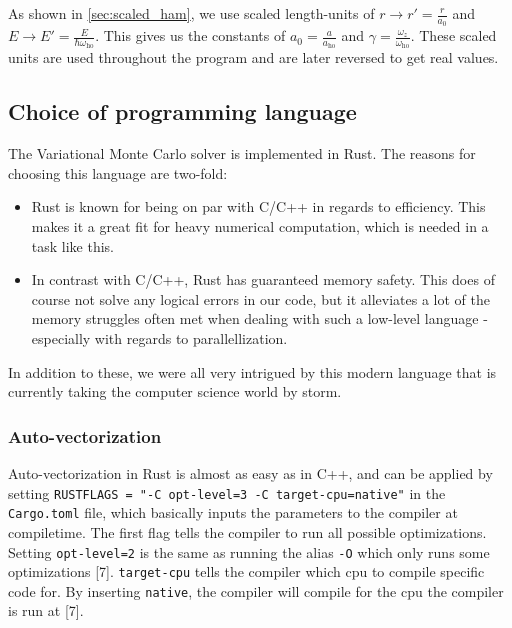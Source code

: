 \documentclass[
]{article}
\providecommand{\tightlist}{%
  \setlength{\itemsep}{0pt}\setlength{\parskip}{0pt}}
\begin{document}
As shown in \ref{sec:scaled_ham}, we use scaled length-units of
\(r \rightarrow r' = \frac{r}{a_0}\) and
\(E \rightarrow E' = \frac{E}{\hbar \omega_\text{ho}}\). This gives us
the constants of \(a_0 = \frac{a}{a_\text{ho}}\) and
\(\gamma = \frac{\omega_z}{\omega_\text{ho}}\). These scaled units are
used throughout the program and are later reversed to get real values.

\hypertarget{choice-of-programming-language}{%
\subsection{Choice of programming
language}\label{choice-of-programming-language}}

The Variational Monte Carlo solver is implemented in Rust. The reasons
for choosing this language are two-fold:

\begin{itemize}
\tightlist
\item
  Rust is known for being on par with C/C++ in regards to efficiency.
  This makes it a great fit for heavy numerical computation, which is
  needed in a task like this.
\item
  In contrast with C/C++, Rust has guaranteed memory safety. This does
  of course not solve any logical errors in our code, but it alleviates
  a lot of the memory struggles often met when dealing with such a
  low-level language - especially with regards to parallellization.
\end{itemize}

In addition to these, we were all very intrigued by this modern language
that is currently taking the computer science world by storm.

\hypertarget{auto-vectorization}{%
\subsubsection{Auto-vectorization}\label{auto-vectorization}}

Auto-vectorization in Rust is almost as easy as in C++, and can be
applied by setting
\texttt{RUSTFLAGS\ =\ "-C\ opt-level=3\ -C\ target-cpu=native"} in the
\texttt{Cargo.toml} file, which basically inputs the parameters to the
compiler at compiletime. The first flag tells the compiler to run all
possible optimizations. Setting \texttt{opt-level=2} is the same as
running the alias \texttt{-O} which only runs some optimizations
{[}7{]}. \texttt{target-cpu} tells the compiler which cpu to compile
specific code for. By inserting \texttt{native}, the compiler will
compile for the cpu the compiler is run at {[}7{]}.
\end{document}
